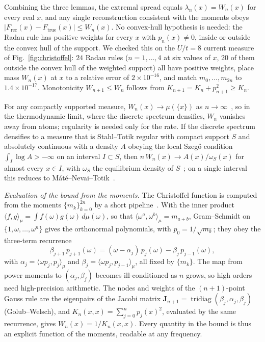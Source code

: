 \documentclass[submission, PhysCore]{SciPost}
\begin{document}
\begin{appendix}
Combining the three lemmas, the extremal spread equals $\lambda_n(x)=W_n(x)$ for every real $x$, and any single reconstruction consistent with the moments obeys $|F_{\mathrm{rec}}(x)-F_{\mathrm{true}}(x)|\le W_n(x)$. No convex-hull hypothesis is needed: the Radau rule has positive weights for every $x$ with ${p_n(x)\neq0}$, inside or outside the convex hull of the support. We checked this on the $U/t=8$ current measure of Fig.~\ref{fig:christoffel}: $24$ Radau rules ($n=1,\dots,4$ at six values of $x$, $20$ of them outside the convex hull of the weighted support) all have positive weights, place mass $W_n(x)$ at $x$ to a relative error of $2\times10^{-16}$, and match $m_0,\dots,m_{2n}$ to $1.4\times10^{-17}$. Monotonicity $W_{n+1}\le W_n$ follows from $K_{n+1}=K_n+p_{n+1}^2\ge K_n$.

For any compactly supported measure, $W_n(x)\to\mu(\{x\})$ as $n\to\infty$~\cite{ShohatTamarkin1943,Nevai1986}, so in the thermodynamic limit, where the discrete spectrum densifies, $W_n$ vanishes away from atoms; regularity is needed only for the rate. If the discrete spectrum densifies to a measure that is Stahl--Totik regular with compact support $S$ and absolutely continuous with a density $A$ obeying the local Szeg\H{o} condition $\int_I\log A>-\infty$ on an interval $I\subset S$, then $n\,W_n(x)\to A(x)/\omega_S(x)$ for almost every $x\in I$, with $\omega_S$ the equilibrium density of $S$~\cite{Totik2000}; on a single interval this reduces to M\'at\'e--Nevai--Totik~\cite{MNT1991}.

\medskip
\noindent\emph{Evaluation of the bound from the moments.}\label{app:evaluate}\enspace
The Christoffel function is computed from the moments $\{m_k\}_{k=0}^{2n}$ by a short pipeline~\cite{GolubWelsch1969,GM2010}. With the inner product $\langle f,g\rangle_\mu=\int f(\omega)g(\omega)\,d\mu(\omega)$, so that $\langle\omega^a,\omega^b\rangle_\mu=m_{a+b}$, Gram--Schmidt on $\{1,\omega,\dots,\omega^n\}$ gives the orthonormal polynomials, with $p_0=1/\sqrt{m_0}$; they obey the three-term recurrence
\begin{equation}
\beta_{j+1}\,p_{j+1}(\omega)=(\omega-\alpha_j)\,p_j(\omega)-\beta_j\,p_{j-1}(\omega),
\label{eq:app-recur}
\end{equation}
with $\alpha_j=\langle\omega p_j,p_j\rangle_\mu$ and $\beta_j=\langle\omega p_j,p_{j-1}\rangle_\mu$, all fixed by $\{m_k\}$. The map from power moments to $(\alpha_j,\beta_j)$ becomes ill-conditioned as $n$ grows, so high orders need high-precision arithmetic. The nodes and weights of the $(n{+}1)$-point Gauss rule are the eigenpairs of the Jacobi matrix $\mathbf{J}_{n+1}=\operatorname{tridiag}(\beta_j,\alpha_j,\beta_j)$ (Golub--Welsch), and $K_n(x,x)=\sum_{j=0}^{n}p_j(x)^2$, evaluated by the same recurrence, gives $W_n(x)=1/K_n(x,x)$. Every quantity in the bound is thus an explicit function of the moments, readable at any frequency.


\end{appendix}
\end{document}
